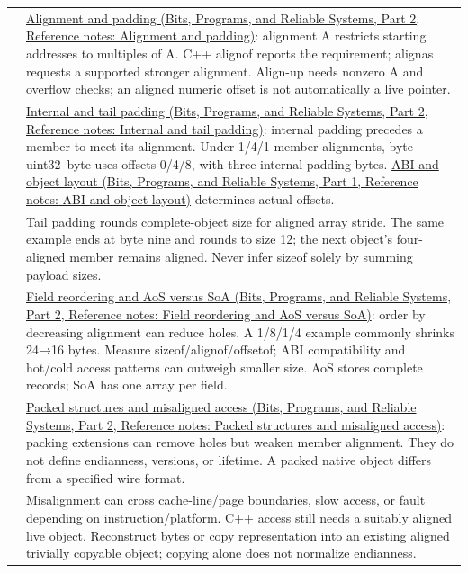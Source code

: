 {\begin{longtable}[]{@{}
  >{\raggedright\arraybackslash}p{}
  >{\raggedright\arraybackslash}p{}@{}}
45 & \href{../01-Bits-Programs-and-Reliable-Systems-P02/main.pdf\#appendix-a1f7c53b4742}{Alignment and padding (Bits, Programs, and Reliable Systems, Part 2, Reference notes: Alignment and padding)}: alignment A restricts starting addresses to multiples of A. C++ alignof reports the requirement; alignas requests a supported stronger alignment. Align-up needs nonzero A and overflow checks; an aligned numeric offset is not automatically a live pointer. \\
46 & \href{../01-Bits-Programs-and-Reliable-Systems-P02/main.pdf\#appendix-f52f8c5a3afd}{Internal and tail padding (Bits, Programs, and Reliable Systems, Part 2, Reference notes: Internal and tail padding)}: internal padding precedes a member to meet its alignment. Under 1/4/1 member alignments, byte--uint32--byte uses offsets 0/4/8, with three internal padding bytes. \href{../01-Bits-Programs-and-Reliable-Systems-P01/main.pdf\#appendix-c4ac6bb0fff8}{ABI and object layout (Bits, Programs, and Reliable Systems, Part 1, Reference notes: ABI and object layout)} determines actual offsets. \\
47 & Tail padding rounds complete-object size for aligned array stride. The same example ends at byte nine and rounds to size 12; the next object's four-aligned member remains aligned. Never infer sizeof solely by summing payload sizes. \\
48 & \href{../01-Bits-Programs-and-Reliable-Systems-P02/main.pdf\#appendix-5522ad176ca0}{Field reordering and AoS versus SoA (Bits, Programs, and Reliable Systems, Part 2, Reference notes: Field reordering and AoS versus SoA)}: order by decreasing alignment can reduce holes. A 1/8/1/4 example commonly shrinks 24→16 bytes. Measure sizeof/alignof/offsetof; ABI compatibility and hot/cold access patterns can outweigh smaller size. AoS stores complete records; SoA has one array per field. \\
49 & \href{../01-Bits-Programs-and-Reliable-Systems-P02/main.pdf\#appendix-0682dbfc5f0e}{Packed structures and misaligned access (Bits, Programs, and Reliable Systems, Part 2, Reference notes: Packed structures and misaligned access)}: packing extensions can remove holes but weaken member alignment. They do not define endianness, versions, or lifetime. A packed native object differs from a specified wire format. \\
50 & Misalignment can cross cache-line/page boundaries, slow access, or fault depending on instruction/platform. C++ access still needs a suitably aligned live object. Reconstruct bytes or copy representation into an existing aligned trivially copyable object; copying alone does not normalize endianness. \\

\end{longtable}}
